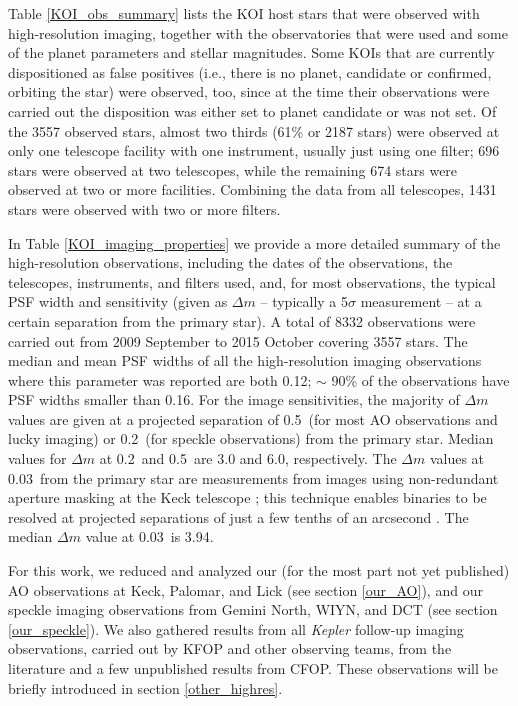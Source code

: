 \documentclass[twocolumn,appendixfloats]{aastex6}
\begin{document}
Table \ref{KOI_obs_summary} lists the KOI host stars that were observed
with high-resolution imaging, together with the observatories that were used and 
some of the planet parameters and stellar magnitudes. Some KOIs that are 
currently dispositioned as false positives (i.e., there is no planet, candidate or 
confirmed, orbiting the star) were observed, too, since at the time their 
observations were carried out the disposition was either set to planet 
candidate or was not set. 
Of the 3557 observed stars, almost two thirds (61\% or 2187 stars) were 
observed at only one telescope facility with one instrument, usually just using 
one filter; 696 stars were observed at two telescopes, while the remaining 674 
stars were observed at two or more facilities. Combining the data from all 
telescopes, 1431 stars were observed with two or more filters.

In Table \ref{KOI_imaging_properties} we provide a more detailed summary
of the high-resolution observations, including the dates of the observations, the
telescopes, instruments, and filters used, and, for most observations, the typical 
PSF width and sensitivity (given as $\Delta m$ -- typically a 5$\sigma$ measurement -- 
at a certain separation from the primary star). A total of 8332 observations were 
carried out from 2009 September to 2015 October covering 3557 stars. 
The median and mean PSF widths of all the high-resolution imaging observations 
where this parameter was reported are both 0.12\arcsec; $\sim$ 90\% of the 
observations have PSF widths smaller than 0.16\arcsec. 
For the image sensitivities, the majority of $\Delta m$ values are given at a projected 
separation of 0.5\arcsec\ (for most AO observations and lucky imaging) or 0.2\arcsec\ 
(for speckle observations) from the primary star. Median values for $\Delta m$ at 
0.2\arcsec\ and 0.5\arcsec\ are 3.0 and 6.0, respectively. The $\Delta m$ 
values at 0.03\arcsec\ from the primary star are measurements from images 
using non-redundant aperture masking at the Keck telescope \citep{kraus16}; 
this technique enables binaries to be resolved at projected separations of just 
a few tenths of an arcsecond \citep[see][]{kraus16}. The median $\Delta m$ 
value at 0.03\arcsec\ is 3.94.

For this work, we reduced and analyzed our (for the most part not yet published)
AO observations at Keck, Palomar, and Lick (see section \ref{our_AO}), and our 
speckle imaging observations from Gemini North, WIYN, and DCT (see section 
\ref{our_speckle}). We also gathered results from all {\it Kepler} follow-up imaging 
observations, carried out by KFOP and other observing teams, from the literature 
and a few unpublished results from CFOP. These observations will be briefly 
introduced in section \ref{other_highres}.
\end{document}
